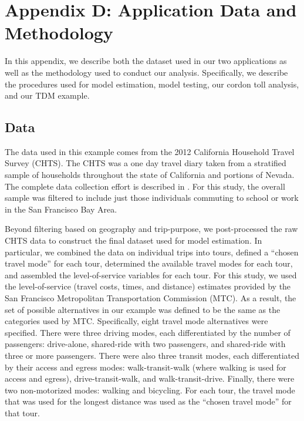 \newpage
\section{Appendix D: Application Data and Methodology}
\label{appendix:data_and_methods}
In this appendix, we describe both the dataset used in our two applications as well as the methodology used to conduct our analysis. Specifically, we describe the procedures used for model estimation, model testing, our cordon toll analysis, and our TDM example.

\subsection{Data}
\label{sec:application_data}
The data used in this example comes from the 2012 California Household Travel Survey (CHTS). The CHTS was a one day travel diary taken from a stratified sample of households throughout the state of California and portions of Nevada. The complete data collection effort is described in \citet{california_department_of_transportation_2010-2012_2013}. For this study, the overall sample was filtered to include just those individuals commuting to school or work in the San Francisco Bay Area.

Beyond filtering based on geography and trip-purpose, we post-processed the raw CHTS data to construct the final dataset used for model estimation. In particular, we combined the data on individual trips into tours, defined a ``chosen travel mode'' for each tour, determined the available travel modes for each tour, and assembled the level-of-service variables for each tour. For this study, we used the level-of-service (travel costs, times, and distance) estimates provided by the San Francisco Metropolitan Transportation Commission (MTC). As a result, the set of possible alternatives in our example was defined to be the same as the categories used by MTC. Specifically, eight travel mode alternatives were specified. There were three driving modes, each differentiated by the number of passengers: drive-alone, shared-ride with two passengers, and shared-ride with three or more passengers. There were also three transit modes, each differentiated by their access and egress modes: walk-transit-walk (where walking is used for access and egress), drive-transit-walk, and walk-transit-drive. Finally, there were two non-motorized modes: walking and bicycling. For each tour, the travel mode that was used for the longest distance was used as the ``chosen travel mode'' for that tour. 

